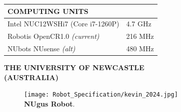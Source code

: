 \documentclass[10pt,a4paper]{article}
\begin{document}
\begin{multicols}{2}
\begin{table}[H]
	\begin{tabular}{|m{5.9cm}|m{1.25cm}|}
		\hline
		\rowcolor[rgb]{0.0, 0.0, 0.0}
		{\color{textcolour}\textbf{{COMPUTING UNITS}}} & \\
		\hline
        Intel NUC12WSHi7 (Core i7-1260P) & 4.7 GHz \\
		\hline
        Robotis OpenCR1.0 \textit{(current)} & 216 MHz \\
		\hline
        NUbots NUsense \textit{(alt)} & 480 MHz \\
		\hline
	\end{tabular}
\end{table}

\columnbreak

\begin{center}
	\colorbox[rgb]{0.0, 0.0, 0.0}
	{
	\begin{minipage}[c][3.5em][c]{0.45\textwidth}
		\begin{center}
			{\color{textcolour}
				{
				\textbf{THE UNIVERSITY OF NEWCASTLE \\
				(AUSTRALIA)}
				}
			}
		\end{center}
	\end{minipage}
	}
\end{center}

\begin{figure}[H]
	\begin{center}
		\texttt{[image: Robot\_Specification/kevin\_2024.jpg]}\\
		\textbf{NUgus Robot}.
	\end{center}
\end{figure}

\end{multicols}
\end{document}
